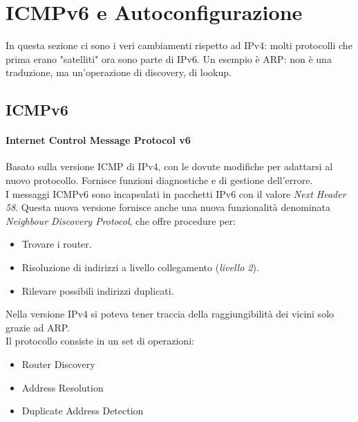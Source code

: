 \documentclass{article}
\begin{document}
\newpage
\section{ICMPv6 e Autoconfigurazione}
In questa sezione ci sono i veri cambiamenti rispetto ad IPv4: molti protocolli che prima erano "satelliti" ora sono parte di IPv6. Un esempio è ARP: non è una traduzione, ma un'operazione di discovery, di lookup. 

\subsection{ICMPv6} 
\paragraph{Internet Control Message Protocol v6}
Basato sulla versione ICMP di IPv4, con le dovute modifiche per adattarsi al nuovo protocollo. Fornisce funzioni diagnostiche e di gestione dell'errore.\\
I messaggi ICMPv6 sono incapsulati in pacchetti IPv6 con il valore \textit{Next Header 58}. Questa nuova versione fornisce anche una nuova funzionalità denominata \textit{Neighbour Discovery Protocol}, che offre procedure per:
\begin{itemize}
    \item Trovare i router.
    \item Risoluzione di indirizzi a livello collegamento (\textit{livello 2}).
    \item Rilevare possibili indirizzi duplicati.
\end{itemize}
Nella versione IPv4 si poteva tener traccia della raggiungibilità dei vicini solo grazie ad ARP.\\ Il protocollo consiste in un set di operazioni:
\begin{itemize}
    \item Router Discovery
    \item Address Resolution
    \item Duplicate Address Detection
\end{itemize}
\end{document}
